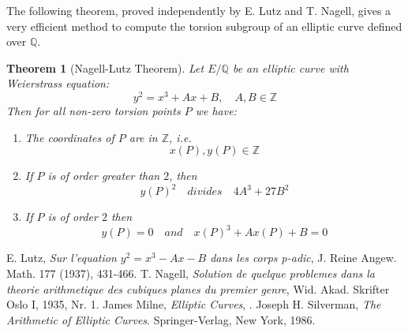\documentclass[12pt]{article}
\newtheorem{thm}{Theorem}
\newcommand{\Ints}{\mathbb{Z}}
\newcommand{\Rats}{\mathbb{Q}}
\begin{document}
The following theorem, proved independently by E. Lutz and T.
Nagell, gives a very efficient method to compute the torsion
subgroup of an elliptic curve defined over $\Rats$.

\begin{thm}[Nagell-Lutz Theorem]
Let $E/\Rats$ be an elliptic curve with Weierstrass equation:
$$y^2=x^3+Ax+B,\quad A,B\in \Ints$$
Then for all non-zero torsion points $P$ we have:
\begin{enumerate}
\item The coordinates of $P$ are in $\Ints$, i.e. $$x(P),y(P)\in
\Ints$$

\item If $P$ is of order greater than $2$, then $$y(P)^2\quad
divides\quad 4A^3+27B^2 $$

\item If $P$ is of order $2$ then $$y(P)=0\quad and\quad
x(P)^3+Ax(P)+B=0$$
\end{enumerate}
\end{thm}

\begin{thebibliography}{9}
 E. Lutz, {\em Sur l'equation $y^2=x^3-Ax-B$ dans
les corps p-adic}, J. Reine Angew. Math. 177 (1937), 431-466.
 T. Nagell, {\em Solution de quelque problemes
dans la theorie arithmetique des cubiques planes du premier
genre}, Wid. Akad. Skrifter Oslo I, 1935, Nr. 1.
 James Milne, {\em Elliptic Curves}, .
 Joseph H. Silverman, {\em The Arithmetic of Elliptic Curves}. Springer-Verlag, New York, 1986.
\end{thebibliography}
\end{document}
